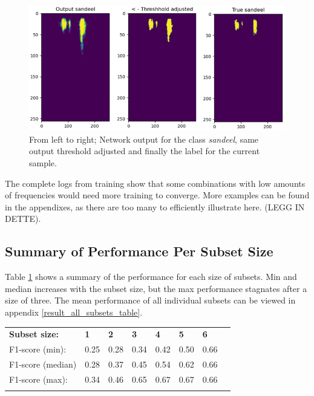         \begin{figure}[H]
            \centering
            \includegraphics[scale=0.7]{figures/SANDEEL_WITH_LABEL.png}
            \caption[Examle output, threshold and label]{From left to right; Network output for the class \textit{sandeel}, same output threshold adjusted and finally the label for the current sample.}
          	\medskip 
            \label{sandeel_threshold_label}
        \end{figure}
    
    
     The complete logs from training show that some combinations with low amounts of frequencies would need more training to converge. More examples can be found in the appendixes, as there are too many to efficiently illustrate here.  (LEGG IN DETTE). 
    

\subsection{Summary of Performance Per Subset Size}
    Table \ref{summary_per_subset_size_table} shows a summary of the performance for each size of subsets. Min and median increases with the subset size, but the max performance stagnates after a size of three. The mean performance of all individual subsets can be viewed in appendix \ref{result_all_subsets_table}.
\begin{longtable}{llllllll}
                  &      &      &      &      &      &      &  \\ \hline
\endfirsthead
%
\endhead
%
\hline
\endfoot
%
\endlastfoot
%
\textbf{Subset size:}      & \textbf{1}    & \textbf{2}    & \textbf{3}    & \textbf{4}    & \textbf{5}    & \textbf{6}    &  \\ \hline
F1-score (min):   & 0.25 & 0.28 & 0.34 & 0.42 & 0.50 & 0.66 &  \\
F1-score (median) & 0.28 & 0.37 & 0.45 & 0.54 & 0.62 & 0.66 &  \\
F1-score (max):   & 0.34 & 0.46 & 0.65 & 0.67 & 0.67 & 0.66 &  \\ \hline
\label{summary_per_subset_size_table}
\end{longtable}
    
